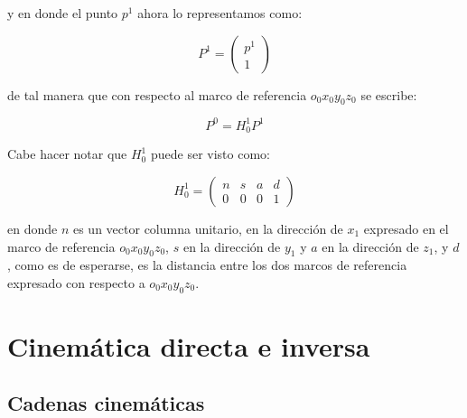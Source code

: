 \begin{multicols*}{2}
            y en donde el punto $p^1$ ahora lo representamos como:

            \begin{equation}
                P^1 =
                \begin{pmatrix}
                    p^1 \\
                    1
                \end{pmatrix}
            \end{equation}

            de tal manera que con respecto al marco de referencia $o_0 x_0 y_0 z_0$ se escribe:

            \begin{equation}
                P^0 = H_0^1 P^1
            \end{equation}

            Cabe hacer notar que $H_0^1$ puede ser visto como:

            \begin{equation}
                H_0^1 =
                \begin{pmatrix}
                    n & s & a & d \\
                    0 & 0 & 0 & 1
                \end{pmatrix}
            \end{equation}

            en donde $n$ es un vector columna unitario, en la dirección de $x_1$ expresado en el marco de referencia $o_0 x_0 y_0 z_0$, $s$ en la dirección de $y_1$ y $a$ en la dirección de $z_1$, y $d$, como es de esperarse, es la distancia entre los dos marcos de referencia expresado con respecto a $o_0 x_0 y_0 z_0$.


    \section{Cinemática directa e inversa}


        \subsection{Cadenas cinemáticas}


\end{multicols*}
